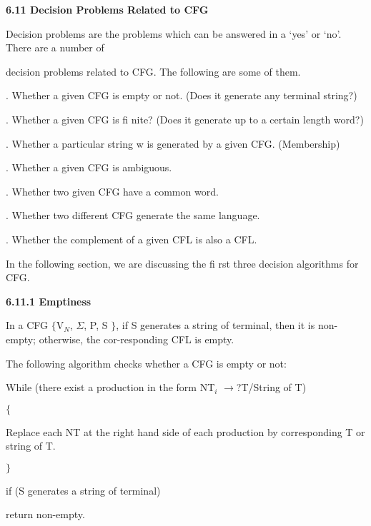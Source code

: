 \noindent \textbf{6.11 Decision Problems Related to CFG}

\noindent Decision problems are the problems which can be answered in a `yes' or `no'. There are a number of

\noindent decision problems related to CFG. The following are some of them.

. Whether a given CFG is empty or not. (Does it generate any terminal string?)

. Whether a given CFG is fi nite? (Does it generate up to a certain length word?)

. Whether a particular string w is generated by a given CFG. (Membership)

. Whether a given CFG is ambiguous.

. Whether two given CFG have a common word.

. Whether two different CFG generate the same language.

. Whether the complement of a given CFL is also a CFL.

\noindent   In the following section, we are discussing the fi rst three decision algorithms for CFG.

\noindent \textbf{6.11.1 Emptiness}

\noindent In a CFG $\mathrm{\{}$V${}_{N}$, $\mathit{\Sigma}$, P, S $\mathrm{\}}$, if S generates a string of terminal, then it is non-empty; otherwise, the cor-responding CFL is empty.

\noindent The following algorithm checks whether a CFG is empty or not:

\noindent While (there exist a production in the form NT${}_{i}$ $\to $?T/String of T)  

\noindent 

\noindent 

\noindent 

\noindent 

\noindent 

\noindent 

\noindent $\mathrm{\{}$

\noindent Replace each NT at the right hand side of each production by corresponding T or string of T.

\noindent $\mathrm{\}}$

\noindent if (S generates a string of terminal)

\noindent return non-empty.

